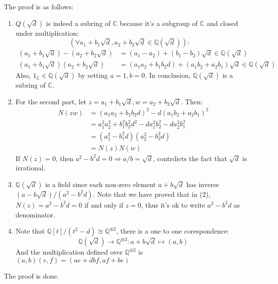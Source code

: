 \documentclass[a4paper, pdf, 12pt]{article}
\makeatletter
\renewenvironment{proof}[1][\proofname]{\par
  \pushQED{\qed}%
  \normalfont \topsep6\p@\@plus6\p@\relax
  \trivlist
  \item[%
    \hskip\labelsep
    \normalfont\bfseries %
    #1%
    \@addpunct{.}%
  ]\ignorespaces
}{%
  \popQED\endtrivlist\@endpefalse
}
\let\qed\relax %
\DeclareRobustCommand{\qed}{%
  \ifmmode \mathqed
  \else
    \leavevmode\unskip\penalty\@M\hbox{}\nobreak\hspace{.5em minus .1em}%
    \hbox{\qedsymbol}%
  \fi
}
\makeatother
\begin{document}
\begin{proof}
  The proof is as follows:
  \begin{enumerate}
  \item $Q(\sqrt{d})$ is indeed a subring of $\mathbb{C}$ because it's a subgroup of $\mathbb{C}$ and closed under 
  multiplication: 
  $$
  (\forall a_1+b_1\sqrt{d}, a_2+b_2\sqrt{d}\in \mathbb{Q}(\sqrt{d})):\quad 
  $$
  $$
  \begin{aligned}
    (a_1+b_1\sqrt{d}) - (a_2+b_2\sqrt{d}) &= (a_1 - a_2) + (b_1-b_2)\sqrt{d}\in \mathbb{Q}(\sqrt{d})\\
    (a_1+b_1\sqrt{d})(a_2 + b_2\sqrt{d}) &= (a_1a_2 + b_1b_2d) + (a_1b_2 + a_2b_1)\sqrt{d}\in \mathbb{Q}(\sqrt{d})
  \end{aligned}
  $$
  Also, $1_{\mathbb{C}}\in \mathbb{Q}(\sqrt{d})$ by setting $a = 1, b = 0$. In conclusion, $\mathbb{Q}(\sqrt{d})$ is a subring of 
  $\mathbb{C}$.

  \item For the second part, let $z = a_1+b_1\sqrt{d}, w = a_2+b_2\sqrt{d}$. Then:
  $$
  \begin{aligned}
    N(zw) &= (a_1a_2+b_1b_2d)^2 - d(a_1b_2 + a_2b_1)^2\\
    &= a_1^2a_2^2 + b_1^2b_2^2d^2 - da_1^2b_2^2-da_2^2b_1^2\\
    &= (a_1^2-b_1^2d)(a_2^2-b_2^2d)\\
    &= N(z)N(w)
  \end{aligned}
  $$
  If $N(z) = 0$, then $a^2-b^2d=0\Rightarrow a/b=\sqrt{d}$, contrdicts the fact that $\sqrt{d}$ is irrational.

  \item $\mathbb{Q}(\sqrt{d})$ is a field since each non-zero element $a+b\sqrt{d}$ has inverse $(a-b\sqrt{d})/(a^2-b^2d)$. Note that 
  we have proved that in (2), $N(z) = a^2-b^2d = 0$ if and only if $z = 0$, thus it's ok to write $a^2-b^2d$ as denominator.
  
  \item Note that $\mathbb{Q}[t]/(t^2 - d)\cong \mathbb{Q}^{\oplus 2}$, there is a one to one corespondence:
  $$
  \mathbb{Q}(\sqrt{d})\rightarrow \mathbb{Q}^{\oplus 2}: a+b\sqrt{d}\mapsto (a, b)
  $$
  And the multiplication defined over $\mathbb{Q}^{\oplus 2}$ is $(a, b)(e, f)=(ae+dbf, af+be)$
\end{enumerate}
The proof is done.
\end{proof}
\end{document}
